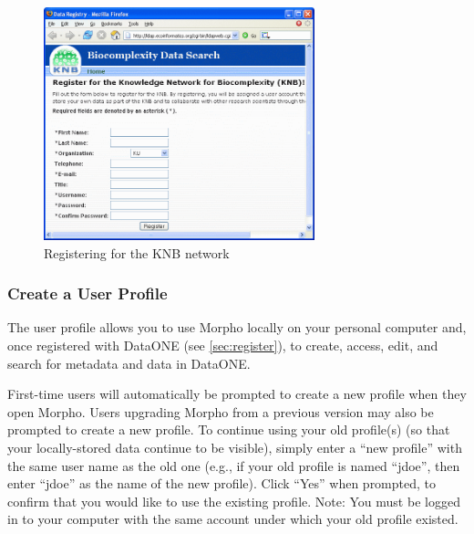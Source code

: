 \begin{figure}
  \centering
    \includegraphics[width=0.7\textwidth]{images/register-knb.png}
  \caption{Registering for the KNB network}
  \label{fig:register-knb}
\end{figure}

\subsubsection{Create a User Profile}

The user profile allows you to use Morpho locally on your personal
computer and, once registered with DataONE (see \ref{sec:register}), to
create, access, edit, and search for metadata and data in DataONE. 

First-time users will automatically be prompted to create a new profile
when they open Morpho. Users upgrading Morpho from a previous version
may also be prompted to create a new profile. To continue using your
old profile(s) (so that your locally-stored data continue to be
visible), simply enter a ``new profile'' with the same user name as the
old one (e.g., if your old profile is named ``jdoe'', then enter
``jdoe'' as the name of the new profile). Click ``Yes'' when prompted,
to confirm that you would like to use the existing profile. Note: You
must be logged in to your computer with the same account under which
your old profile existed.

